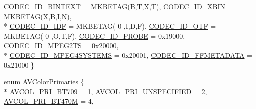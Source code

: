\begin{DoxyCompactItemize}
\hyperlink{group__lavc__core_ggaadca229ad2c20e060a14fec08a5cc7ceaa808c261ae7e484b3055facd20acb5cb}{C\+O\+D\+E\+C\+\_\+\+I\+D\+\_\+\+B\+I\+N\+T\+E\+XT} = M\+K\+B\+E\+T\+AG(\textquotesingle{}B\textquotesingle{},\textquotesingle{}T\textquotesingle{},\textquotesingle{}X\textquotesingle{},\textquotesingle{}T\textquotesingle{}), 
\hyperlink{group__lavc__core_ggaadca229ad2c20e060a14fec08a5cc7cea3176a233fa27aeb424c94202f18819d7}{C\+O\+D\+E\+C\+\_\+\+I\+D\+\_\+\+X\+B\+IN} = M\+K\+B\+E\+T\+AG(\textquotesingle{}X\textquotesingle{},\textquotesingle{}B\textquotesingle{},\textquotesingle{}I\textquotesingle{},\textquotesingle{}N\textquotesingle{}), 
\\*
\hyperlink{group__lavc__core_ggaadca229ad2c20e060a14fec08a5cc7ceae6734abf698be915473056fcb1c5b575}{C\+O\+D\+E\+C\+\_\+\+I\+D\+\_\+\+I\+DF} = M\+K\+B\+E\+T\+AG( 0 ,\textquotesingle{}I\textquotesingle{},\textquotesingle{}D\textquotesingle{},\textquotesingle{}F\textquotesingle{}), 
\hyperlink{group__lavc__core_ggaadca229ad2c20e060a14fec08a5cc7ceab4c10ac6a15c190d33ad36f4ee0bb844}{C\+O\+D\+E\+C\+\_\+\+I\+D\+\_\+\+O\+TF} = M\+K\+B\+E\+T\+AG( 0 ,\textquotesingle{}O\textquotesingle{},\textquotesingle{}T\textquotesingle{},\textquotesingle{}F\textquotesingle{}), 
\hyperlink{group__lavc__core_ggaadca229ad2c20e060a14fec08a5cc7ceafadcda6258a7bb209534ff9a8833a8a0}{C\+O\+D\+E\+C\+\_\+\+I\+D\+\_\+\+P\+R\+O\+BE} = 0x19000, 
\hyperlink{group__lavc__core_ggaadca229ad2c20e060a14fec08a5cc7ceae880111250685190cff9704387f8d9ee}{C\+O\+D\+E\+C\+\_\+\+I\+D\+\_\+\+M\+P\+E\+G2\+TS} = 0x20000, 
\\*
\hyperlink{group__lavc__core_ggaadca229ad2c20e060a14fec08a5cc7cea872f2950d569e2d2db3918d724c43f64}{C\+O\+D\+E\+C\+\_\+\+I\+D\+\_\+\+M\+P\+E\+G4\+S\+Y\+S\+T\+E\+MS} = 0x20001, 
\hyperlink{group__lavc__core_ggaadca229ad2c20e060a14fec08a5cc7ceaf146d4e2b776d3eb820883c113a7c899}{C\+O\+D\+E\+C\+\_\+\+I\+D\+\_\+\+F\+F\+M\+E\+T\+A\+D\+A\+TA} = 0x21000
 \}
\item 
enum \hyperlink{group__lavc__core_gad384ee5a840bafd73daef08e6d9cafe7}{A\+V\+Color\+Primaries} \{ \\*
\hyperlink{group__lavc__core_ggad384ee5a840bafd73daef08e6d9cafe7a4f1c38f3e06cd2c49b28046bbf3a4cbd}{A\+V\+C\+O\+L\+\_\+\+P\+R\+I\+\_\+\+B\+T709} = 1, 
\hyperlink{group__lavc__core_ggad384ee5a840bafd73daef08e6d9cafe7a868aff08a725fc038a7f37b5e9d01942}{A\+V\+C\+O\+L\+\_\+\+P\+R\+I\+\_\+\+U\+N\+S\+P\+E\+C\+I\+F\+I\+ED} = 2, 
\hyperlink{group__lavc__core_ggad384ee5a840bafd73daef08e6d9cafe7ae5d6b90d4f36ac68f3a5ef347d930cc9}{A\+V\+C\+O\+L\+\_\+\+P\+R\+I\+\_\+\+B\+T470M} = 4, 

\end{DoxyCompactItemize}
